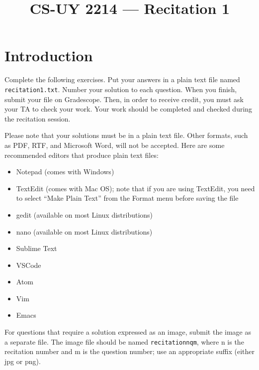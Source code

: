 \documentclass{article}
\begin{document}
\title{CS-UY 2214 — Recitation 1}
\date{}
\maketitle

\section*{Introduction}
Complete the following exercises. Put your answers in a plain text file named \texttt{recitation1.txt}. Number your solution to each question. When you finish, submit your file on Gradescope. Then, in order to receive credit, you must ask your TA to check your work. Your work should be completed and checked during the recitation session.

Please note that your solutions must be in a plain text file. Other formats, such as PDF, RTF, and Microsoft Word, will not be accepted. Here are some recommended editors that produce plain text files:
\begin{itemize}
    \item Notepad (comes with Windows)
    \item TextEdit (comes with Mac OS); note that if you are using TextEdit, you need to select “Make Plain Text” from the Format menu before saving the file
    \item gedit (available on most Linux distributions)
    \item nano (available on most Linux distributions)
    \item Sublime Text
    \item VSCode
    \item Atom
    \item Vim
    \item Emacs
\end{itemize}

For questions that require a solution expressed as an image, submit the image as a separate file. The image file should be named \texttt{recitationnqm}, where n is the recitation number and m is the question number; use an appropriate suffix (either jpg or png).
\end{document}
